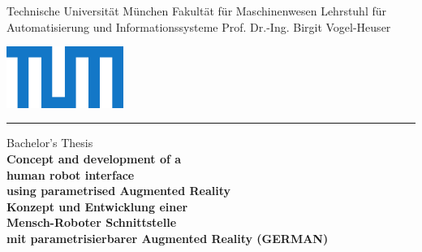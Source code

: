 \begin{titlepage}
	\begin{center}
%
%	
	\begin{minipage}[c]{9cm}
		\small
		Technische Universität München\newline
		Fakultät für Maschinenwesen\newline
		Lehrstuhl für Automatisierung und Informationssysteme\newline
		Prof. Dr.-Ing. Birgit Vogel-Heuser
	\end{minipage}
	\begin{minipage}[c]{6cm}
		\centering \includegraphics[height=2.0cm]{Figures/TUM_Logo_cmyk.pdf}
	\end{minipage}
%
%
%		
%		

	\rule{0.95\textwidth}{0.3mm}
	
	\vspace{1.0cm}
		
	\LARGE
	Bachelor's Thesis
	\\[1cm]
	\huge
	\textbf{Concept and development of a\\human robot interface\\using parametrised Augmented Reality}\\
	\vspace{0.8cm}
	\huge
	\textbf{Konzept und Entwicklung einer\\Mensch-Roboter Schnittstelle\\mit parametrisierbarer Augmented Reality (GERMAN)}
	\end{center}
	

\end{titlepage}
